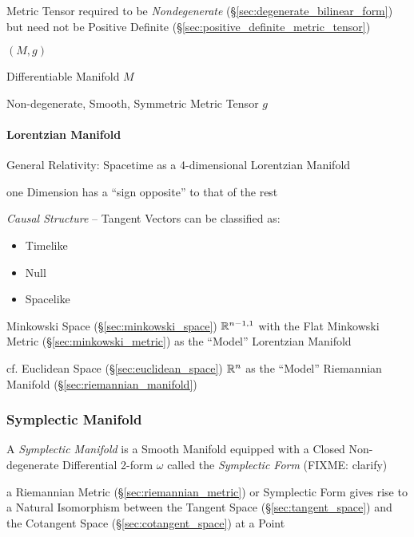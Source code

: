 Metric Tensor required to be \emph{Nondegenerate}
(\S\ref{sec:degenerate_bilinear_form}) but need not be Positive
Definite (\S\ref{sec:positive_definite_metric_tensor})

$(M,g)$

Differentiable Manifold $M$

Non-degenerate, Smooth, Symmetric Metric Tensor $g$



\paragraph{Lorentzian Manifold}\label{sec:lorentzian_manifold}\hfill

General Relativity: Spacetime as a 4-dimensional Lorentzian Manifold

one Dimension has a ``sign opposite'' to that of the rest

\emph{Causal Structure} -- Tangent Vectors can be classified as:
\begin{itemize}
  \item Timelike
  \item Null
  \item Spacelike
\end{itemize}

Minkowski Space (\S\ref{sec:minkowski_space}) $\mathbb{R}^{n-1,1}$
with the Flat Minkowski Metric (\S\ref{sec:minkowski_metric}) as the
``Model'' Lorentzian Manifold

cf. Euclidean Space (\S\ref{sec:euclidean_space}) $\mathbb{R}^n$ as the
``Model'' Riemannian Manifold (\S\ref{sec:riemannian_manifold})



\subsubsection{Symplectic Manifold}\label{sec:symplectic_manifold}

A \emph{Symplectic Manifold} is a Smooth Manifold equipped with a Closed
Non-degenerate Differential 2-form $\omega$ called the \emph{Symplectic Form}
(FIXME: clarify)

a Riemannian Metric (\S\ref{sec:riemannian_metric}) or Symplectic Form gives
rise to a Natural Isomorphism between the Tangent Space
(\S\ref{sec:tangent_space}) and the Cotangent Space
(\S\ref{sec:cotangent_space}) at a Point




